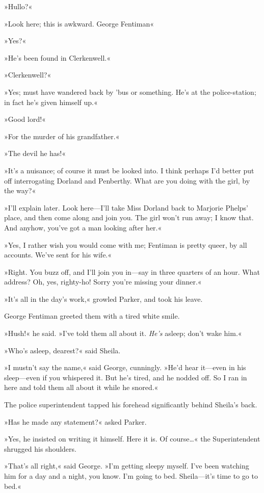 »Hullo?«

»Look here; this is awkward. George Fentiman\longdash«

»Yes?«

»He's been found in Clerkenwell.«

»Clerkenwell?«

»Yes; must have wandered back by 'bus or something. He's at the police-station; in fact he's given himself up.«

»Good lord!«

»For the murder of his grandfather.«

»The devil he has!«

»It's a nuisance; of course it must be looked into. I think perhaps I'd better put off interrogating Dorland and Penberthy. What are you doing with the girl, by the way?«

»I'll explain later. Look here—I'll take Miss Dorland back to Marjorie Phelps' place, and then come along and join you. The girl won't run away; I know that. And anyhow, you've got a man looking after her.«

»Yes, I rather wish you would come with me; Fentiman is pretty queer, by all accounts. We've sent for his wife.«

»Right. You buzz off, and I'll join you in—say in three quarters of an hour. What address? Oh, yes, righty-ho! Sorry you're missing your dinner.«

»It's all in the day's work,« growled Parker, and took his leave.

George Fentiman greeted them with a tired white smile.

»Hush!« he said. »I've told them all about it. \textit{He's} asleep; don't wake him.«

»Who's asleep, dearest?« said Sheila.

»I mustn't say the name,« said George, cunningly. »He'd hear it—even in his sleep—even if you whispered it. But he's tired, and he nodded off. So I ran in here and told them all about it while he snored.«

The police superintendent tapped his forehead significantly behind Sheila's back.

»Has he made any statement?« asked Parker.

»Yes, he insisted on writing it himself. Here it is. Of course\dots« the Superintendent shrugged his shoulders.

»That's all right,« said George. »I'm getting sleepy myself. I've been watching him for a day and a night, you know. I'm going to bed. Sheila—it's time to go to bed.«

